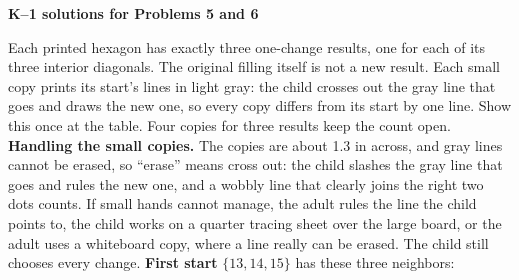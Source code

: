 \documentclass[11pt,letterpaper]{article}
\newcommand{\pagehead}[1]{{\Large\bfseries #1}\par\vspace{3pt}}
\newcommand{\prob}[2]{\par\vspace{5pt}{\large\bfseries #1}\par #2}
\begin{document}
\newpage
\pagehead{K--1 solutions for Problems 5 and 6}
\prob{Problem 5}{Each printed hexagon has exactly three one-change results, one for each of its three interior diagonals. The original filling itself is not a new result. Each small copy prints its start's lines in light gray: the child crosses out the gray line that goes and draws the new one, so every copy differs from its start by one line. Show this once at the table. Four copies for three results keep the count open.}
\textbf{Handling the small copies.} The copies are about 1.3 in across, and gray lines cannot be erased, so ``erase'' means cross out: the child slashes the gray line that goes and rules the new one, and a wobbly line that clearly joins the right two dots counts. If small hands cannot manage, the adult rules the line the child points to, the child works on a quarter tracing sheet over the large board, or the adult uses a whiteboard copy, where a line really can be erased. The child still chooses every change.
\textbf{First start} $\{13,14,15\}$ has these three neighbors:
\end{document}
